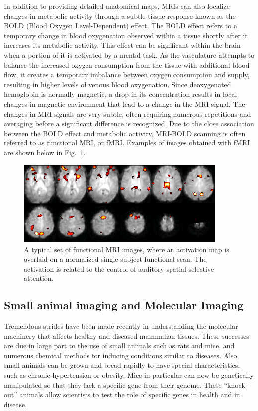 In addition to providing detailed anatomical maps, MRIs can also localize changes in metabolic activity through a subtle tissue response known as the BOLD (Blood Oxygen Level-Dependent) effect. The BOLD effect refers to a temporary change in blood oxygenation observed within a tissue shortly after it increases its metabolic activity. This effect can be significant within the brain when a portion of it is activated by a mental task. As the vasculature attempts to balance the increased oxygen consumption from the tissue with additional blood flow, it creates a temporary imbalance between oxygen consumption and supply, resulting in higher levels of venous blood oxygenation. Since deoxygenated hemoglobin is normally magnetic, a drop in its concentration results in local changes in magnetic environment that lead to a change in the MRI signal.  The changes in MRI signals are very subtle, often requiring numerous repetitions and averaging before a significant difference is recognized. Due to the close association between the BOLD effect and metabolic activity, MRI-BOLD scanning is often referred to as functional MRI, or fMRI. Examples of images obtained with fMRI are shown below in Fig.~\ref{Fig10-17}.
\begin{figure}[!htb]
	\centering
	\includegraphics[width=4.0in]{./figures/Topic10/Fig10-17.png}
	\caption{A typical set of functional MRI images, where an activation map is overlaid on a normalized single subject functional scan.  The activation is related to the control of auditory spatial selective attention.}
	\label{Fig10-17}
\end{figure} 
 
\subsection{Small animal imaging and Molecular Imaging}

Tremendous strides have been made recently in understanding the molecular machinery that affects healthy and diseased mammalian tissues. These successes are due in large part to the use of small animals such as rats and mice, and numerous chemical methods for inducing conditions similar to diseases.   Also, small animals can be grown and bread rapidly to have special characteristics, such as chronic hypertension or obesity. Mice in particular can now be genetically manipulated so that they lack a specific gene from their genome. These “knock-out” animals allow scientists to test the role of specific genes in health and in disease.

